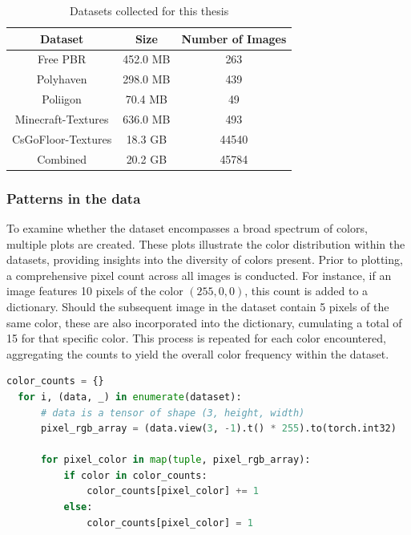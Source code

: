     \begin{table}[h]
        \centering
        \begin{tabular}{|c|c|c|}
            \hline
            Dataset & Size & Number of Images \\
            \hline
            Free PBR & 452.0 MB & 263 \\
            Polyhaven & 298.0 MB & 439 \\
            Poliigon & 70.4 MB & 49 \\
            Minecraft-Textures &  636.0 MB & 493 \\
            CsGoFloor-Textures & 18.3 GB & 44540 \\
            \hline
            Combined & 20.2 GB & 45784 \\
            \hline
        \end{tabular}
        \caption{Datasets collected for this thesis}
        \label{tab:datasets}
    \end{table}

    \subsubsection{Patterns in the data}
    
    To examine whether the dataset encompasses a broad spectrum of colors, multiple plots are created. These plots illustrate the color distribution within the datasets, providing insights into the diversity of colors present. Prior to plotting, a comprehensive pixel count across all images is conducted. For instance, if an image features 10 pixels of the color $(255, 0, 0)$, this count is added to a dictionary. Should the subsequent image in the dataset contain 5 pixels of the same color, these are also incorporated into the dictionary, cumulating a total of 15 for that specific color. This process is repeated for each color encountered, aggregating the counts to yield the overall color frequency within the dataset.

\begin{lstlisting}[language=Python]
  color_counts = {} 
  for i, (data, _) in enumerate(dataset):
      # data is a tensor of shape (3, height, width) 
      pixel_rgb_array = (data.view(3, -1).t() * 255).to(torch.int32)
      
      for pixel_color in map(tuple, pixel_rgb_array):
          if color in color_counts:
              color_counts[pixel_color] += 1
          else:
              color_counts[pixel_color] = 1
\end{lstlisting}

